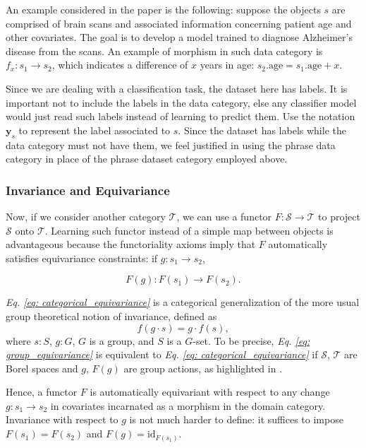 \documentclass[11pt,a4paper,openright,twoside]{report}
\theoremstyle{plain}
\theoremstyle{definition}
\begin{document}
An example considered in the paper is the following: suppose the objects $s$ are comprised of brain scans and associated information concerning patient age and other covariates. The goal is to develop a model trained to diagnose Alzheimer's disease from the scans. An example of morphism in such data category is $f_x: s_1 \to s_2$, which indicates a difference of $x$ years in age: $s_2.\mathrm{age} = s_1.\mathrm{age} + x$.


Since we are dealing with a classification task, the dataset here has labels. It is important not to include the labels in the data category, else any classifier model would just read such labels instead of learning to predict them. Use the notation $\mathbf{y}_s$ to represent the label associated to $s$. Since the dataset has labels while the data category must not have them, we feel justified in using the phrase data category in place of the phrase dataset category employed above.


\subsubsection{Invariance and Equivariance}


Now, if we consider another category $\mathcal{T}$, we can use a functor $F: \mathcal{S} \to \mathcal{T}$ to project $\mathcal{S}$ onto $\mathcal{T}$. Learning such functor instead of a simple map between objects is advantageous because the functoriality axioms imply that $F$ automatically satisfies equivariance constraints: if $g: s_1 \to s_2$,

\begin{equation}
  \label{eq: categorical_equivariance}
  F(g): F(s_1) \to F(s_2).
\end{equation}

\textit{Eq. \ref{eq: categorical_equivariance}} is a categorical generalization of the more usual group theoretical notion of invariance, defined as
\begin{equation}
  \label{eq: group_equivariance}
  f(g \cdot s) = g \cdot f(s),
\end{equation}
where $s : S$, $g : G$, $G$ is a group, and $S$ is a $G$-set. To be precise, \textit{Eq. \ref{eq: group_equivariance}} is equivalent to \textit{Eq. \ref{eq: categorical_equivariance}} if $\mathcal{S}$, $\mathcal{T}$ are Borel spaces and $g$, $F(g)$ are group actions, as highlighted in \cite{chytas2024poolingimagedatasetsmultiple}.


Hence, a functor $F$ is automatically equivariant with respect to any change $g: s_1 \to s_2$ in covariates incarnated as a morphism in the domain category. Invariance with respect to $g$ is not much harder to define: it suffices to impose $F(s_1) = F(s_2)$ and $F(g) = \mathrm{id}_{F(s_1)}$.
\end{document}
